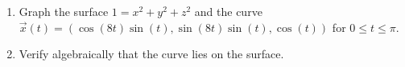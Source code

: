 \begin{problem}
\begin{enumerate}
\item Graph the surface $1 = x^2 + y^2 + z^2$ and the curve $\vec{x}(t) = (\cos(8t)\sin(t),\sin(8t)\sin(t), \cos(t) )$ for $0\leq t\leq \pi$.
\item Verify algebraically that the curve lies on the surface.
\end{enumerate}
\end{problem}